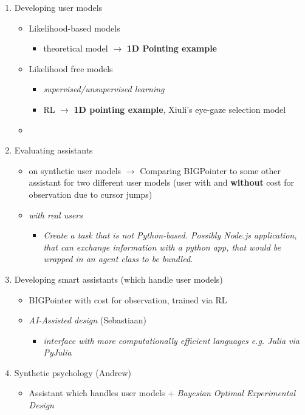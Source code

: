 \documentclass[12pt,a4paper]{article}
\begin{document}
\begin{enumerate}

\item Developing user models
	\begin{itemize}
	\item Likelihood-based models 
		\begin{itemize}
		\item theoretical model $\longrightarrow$ \textbf{1D Pointing example}
		\end{itemize}
	\item Likelihood free models
		\begin{itemize}
		\item  \textit{supervised/unsupervised learning} 
		\item RL $\longrightarrow$ \textbf{1D pointing example}, Xiuli's eye-gaze selection model
		\end{itemize}
	\item 
		\end{itemize}
\item Evaluating assistants 
	\begin{itemize}
	\item on synthetic user models $\longrightarrow$ Comparing BIGPointer to some other assistant for two different user models (user with and \textbf{without} cost for observation due to cursor jumps)
	\item \textit{with real users}
		\begin{itemize}
		\item \textit{Create a task that is not Python-based. Possibly Node.js application, that can exchange information with a python app, that would be wrapped in an agent class to be bundled.}
		\end{itemize}
	\end{itemize}
\item Developing smart assistants (which handle user models)
	\begin{itemize}
	\item BIGPointer with cost for observation, trained via RL
	\item \textit{AI-Assisted design} (Sebastiaan)
		\begin{itemize}
		\item \textit{interface with more computationally efficient languages e.g. Julia via PyJulia}
		\end{itemize}
	\end{itemize}
	
\item Synthetic psychology (Andrew)
	\begin{itemize}
	\item Assistant which handles user models + \textit{Bayesian Optimal Experimental Design}
	\end{itemize}
	

\end{enumerate}
\end{document}
